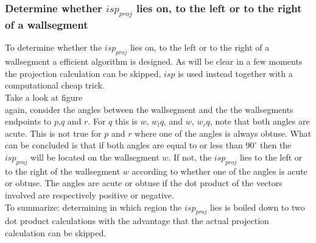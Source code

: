 \documentclass[10pt]{article}
\begin{document}


\subsubsection{Determine whether $isp_{proj}$ lies on, to the left or to the
right of a wallsegment}
To determine whether the $isp_{proj}$ lies on, to the left or to the right of a
wallsegment a efficient algorithm is designed. As will be clear in a few moments
the projection calculation can be skipped, $isp$ is used instead together with a
computational cheap trick.\\


Take a look at figure \\
again, consider the angles between the wallsegment and the
the wallsegments endpoints to $p$,$q$ and $r$.
For $q$ this is $w$, $w_l q$, and $w$, $w_r q$, note that both angles are acute.
This is not true for $p$ and $r$ where one of the angles is always obtuse.
What can be concluded is that if both angles are equal to or less than
$90^{\circ}$ then the $isp_{proj}$ will be located on the wallsegment $w$. If not,
the $isp_{proj}$ lies to the left or to the right of the wallsegment $w$ according to
whether one of the angles is acute or obtuse.  
The angles are acute or obtuse if the dot product of the vectors involved are
respectively positive or negative.\\
To summarize: determining in which region the $isp_{proj}$ lies is boiled down to
two dot product calculations with the advantage that the actual projection
calculation can be skipped.
\end{document}

